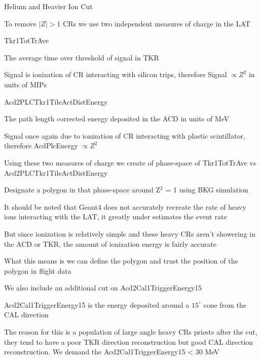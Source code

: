 \documentclass{article}
\begin{document}
\begin{myEnumerate}
\begin{myEnumerate}
				\item Helium and Heavier Ion Cut
				\begin{myEnumerate}
					\item To remove $|Z| > 1$ CRs we use two independent measures of charge in the LAT
					\item Tkr1TotTrAve
					\begin{myEnumerate}
						\item The average time over threshold of signal in TKR
						\item Signal is ionization of CR interacting with silicon trips, therefore Signal $\propto Z^2$ in units of MIPs
					\end{myEnumerate}
					\item Acd2PLCTkr1TileActDistEnergy
					\begin{myEnumerate}
						\item The path length corrected energy deposited in the ACD in units of MeV
						\item Signal once again due to ionization of CR interacting with plastic scintillator, therefore AcdPlcEnergy $\propto Z^2$
					\end{myEnumerate}
					\item Using these two measures of charge we create of phase-space of Tkr1TotTrAve vs  \\Acd2PLCTkr1TileActDistEnergy 
					\item Designate a polygon in that phase-space around Z$^2$ = 1 using BKG simulation
					\begin{myEnumerate}
						\item It should be noted that Geant4 does not accurately recreate the rate of heavy ions interacting with the LAT, it greatly under estimates the event rate
						\item But since ionization is relatively simple and these heavy CRs aren't showering in the ACD or TKR, the amount of ionization energy is fairly accurate
						\item What this means is we can define the polygon and trust the position of the polygon in flight data
					\end{myEnumerate}
					\item We also include an additional cut on Acd2Cal1TriggerEnergy15
					\begin{myEnumerate}
						\item Acd2Cal1TriggerEnergy15 is the energy deposited around a $15^{\circ}$ cone from the CAL direction
						\item The reason for this is a population of large angle heavy CRs priests after the cut, they tend to have a poor TKR direction reconstruction but good CAL direction reconstruction.  We demand the Acd2Cal1TriggerEnergy15 < 30 MeV

\end{myEnumerate}
\end{myEnumerate}
\end{myEnumerate}
\end{myEnumerate}
\end{document}
